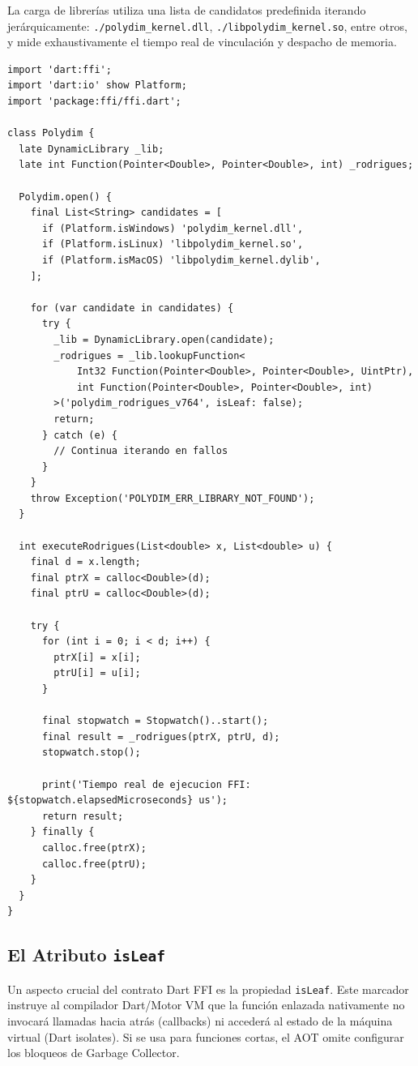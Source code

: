 La carga de librerías utiliza una lista de candidatos predefinida iterando jerárquicamente: \texttt{./polydim\_kernel.dll}, \texttt{./libpolydim\_kernel.so}, entre otros, y mide exhaustivamente el tiempo real de vinculación y despacho de memoria.

\begin{verbatim}
import 'dart:ffi';
import 'dart:io' show Platform;
import 'package:ffi/ffi.dart';

class Polydim {
  late DynamicLibrary _lib;
  late int Function(Pointer<Double>, Pointer<Double>, int) _rodrigues;

  Polydim.open() {
    final List<String> candidates = [
      if (Platform.isWindows) 'polydim_kernel.dll',
      if (Platform.isLinux) 'libpolydim_kernel.so',
      if (Platform.isMacOS) 'libpolydim_kernel.dylib',
    ];
    
    for (var candidate in candidates) {
      try {
        _lib = DynamicLibrary.open(candidate);
        _rodrigues = _lib.lookupFunction<
            Int32 Function(Pointer<Double>, Pointer<Double>, UintPtr),
            int Function(Pointer<Double>, Pointer<Double>, int)
        >('polydim_rodrigues_v764', isLeaf: false);
        return;
      } catch (e) {
        // Continua iterando en fallos
      }
    }
    throw Exception('POLYDIM_ERR_LIBRARY_NOT_FOUND');
  }

  int executeRodrigues(List<double> x, List<double> u) {
    final d = x.length;
    final ptrX = calloc<Double>(d);
    final ptrU = calloc<Double>(d);
    
    try {
      for (int i = 0; i < d; i++) {
        ptrX[i] = x[i];
        ptrU[i] = u[i];
      }
      
      final stopwatch = Stopwatch()..start();
      final result = _rodrigues(ptrX, ptrU, d);
      stopwatch.stop();
      
      print('Tiempo real de ejecucion FFI: ${stopwatch.elapsedMicroseconds} us');
      return result;
    } finally {
      calloc.free(ptrX);
      calloc.free(ptrU);
    }
  }
}
\end{verbatim}

\subsection{El Atributo \texttt{isLeaf}}
Un aspecto crucial del contrato Dart FFI es la propiedad \texttt{isLeaf}. Este marcador instruye al compilador Dart/Motor VM que la función enlazada nativamente no invocará llamadas hacia atrás (callbacks) ni accederá al estado de la máquina virtual (Dart isolates). Si se usa para funciones cortas, el AOT omite configurar los bloqueos de Garbage Collector. 

